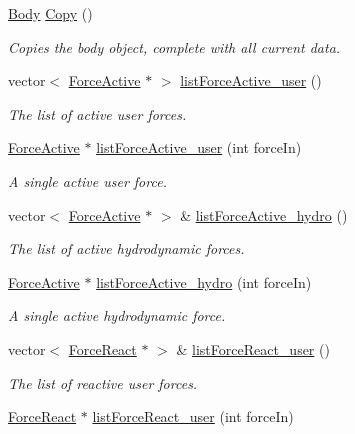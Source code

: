 \begin{DoxyCompactItemize}
\hyperlink{class_body}{Body} \hyperlink{class_body_a370dc9a5702d93d9295a9618ebdef456}{Copy} ()
\begin{DoxyCompactList}\small\item\em Copies the body object, complete with all current data. \end{DoxyCompactList}\item 
vector$<$ \hyperlink{class_force_active}{Force\-Active} $\ast$ $>$ \hyperlink{class_body_acc646c06517d67b4d8dba821b5f87d8e}{list\-Force\-Active\-\_\-user} ()
\begin{DoxyCompactList}\small\item\em The list of active user forces. \end{DoxyCompactList}\item 
\hyperlink{class_force_active}{Force\-Active} $\ast$ \hyperlink{class_body_ad55994a87e95520959a2d236e02168ea}{list\-Force\-Active\-\_\-user} (int force\-In)
\begin{DoxyCompactList}\small\item\em A single active user force. \end{DoxyCompactList}\item 
vector$<$ \hyperlink{class_force_active}{Force\-Active} $\ast$ $>$ \& \hyperlink{class_body_a2169495533eebe0f4f05d9e2cb71f42b}{list\-Force\-Active\-\_\-hydro} ()
\begin{DoxyCompactList}\small\item\em The list of active hydrodynamic forces. \end{DoxyCompactList}\item 
\hyperlink{class_force_active}{Force\-Active} $\ast$ \hyperlink{class_body_aa83129940f0eb3a27686b35292bf3339}{list\-Force\-Active\-\_\-hydro} (int force\-In)
\begin{DoxyCompactList}\small\item\em A single active hydrodynamic force. \end{DoxyCompactList}\item 
vector$<$ \hyperlink{class_force_react}{Force\-React} $\ast$ $>$ \& \hyperlink{class_body_afc1e6e0018dd26cc3702b74aea12ed9b}{list\-Force\-React\-\_\-user} ()
\begin{DoxyCompactList}\small\item\em The list of reactive user forces. \end{DoxyCompactList}\item 
\hyperlink{class_force_react}{Force\-React} $\ast$ \hyperlink{class_body_a8afe32e16a7869395083de6cb0aca63e}{list\-Force\-React\-\_\-user} (int force\-In)

\end{DoxyCompactItemize}
